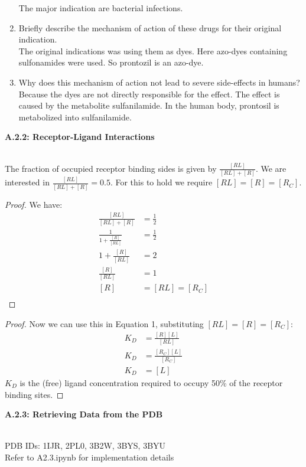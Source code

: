 \documentclass[a4paper,10pt]{article}
\begin{document}
\begin{enumerate}
    The major indication are bacterial infections. 
    \item Briefly describe the mechanism of action of these drugs for their original indication. \\
    The original indications was using them as dyes. Here azo-dyes containing sulfonamides were used. So prontozil is an azo-dye.
    \item Why does this mechanism of action not lead to severe side-effects in humans? \\
    Because the dyes are not directly responsible for the effect. The effect is caused by the metabolite sulfanilamide. In the human body, prontosil is metabolized into sulfanilamide. 
\end{enumerate}


\begin{large}
	\vspace{1.0cm}
	\textbf{A.2.2: Receptor-Ligand Interactions}
\end{large}	\\ [2mm]


The fraction of occupied receptor binding sides is given by $\frac{[RL]}{[RL]+ [R]}$. We are interested in $\frac{[RL]}{[RL]+ [R]} = 0.5$. For this to hold we require $[RL] = [R] = [R_C]$.
\begin{proof}
We have:
\begin{align*}
\frac{[RL]}{[RL]+ [R]} &= \frac{1}{2} \\
         \frac{1}{1 +\frac{[R]}{[RL]}} &= \frac{1}{2}  \\
         1 +\frac{[R]}{[RL]} &= 2  \\
         \frac{[R]}{[RL]} &= 1  \\
         [R] &= [RL]  = [R_C]\\
\end{align*}
\end{proof}
\begin{proof}
Now we can use this in Equation 1, substituting $[RL] = [R] = [R_C]$:
\begin{align*}
K_D& = \frac{[R][L]}{[RL]} \\
K_D &= \frac{[R_C][L]}{[R_C]} \\
         K_D &= [L]
\end{align*}
$K_D$ is the (free) ligand concentration required to occupy 50\% of the receptor binding sites.
\end{proof}


\begin{large}
	\vspace{1.0cm}
	\textbf{A.2.3: Retrieving Data from the PDB}
\end{large}	\\ [2mm]


PDB IDs: 1IJR, 2PL0, 3B2W, 3BYS, 3BYU \\
Refer to A2.3.ipynb for implementation details



\end{document}
